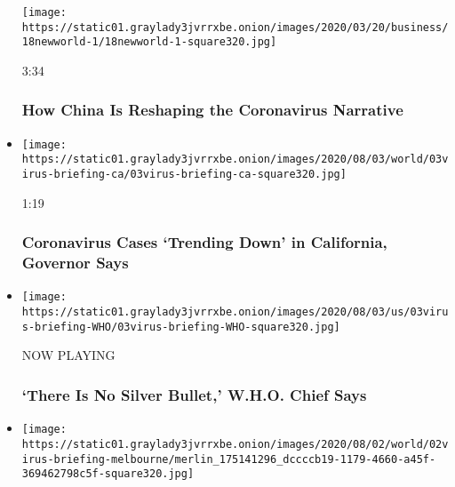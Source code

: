 \begin{itemize}
  \texttt{[image: https://static01.graylady3jvrrxbe.onion/images/2020/03/20/business/18newworld-1/18newworld-1-square320.jpg]}

  3:34

  \hypertarget{how-china-is-reshaping-the-coronavirus-narrative}{%
  \subsubsection{How China Is Reshaping the Coronavirus
  Narrative}\label{how-china-is-reshaping-the-coronavirus-narrative}}
\item
  \href{https://www.nytimes3xbfgragh.onion/video/us/100000007271181/california-virus-cases-trend-down.html?action=click\&module=video-series-bar\&region=header\&pgtype=Article\&playlistId=video/coronavirus-news-update}{}

  \texttt{[image: https://static01.graylady3jvrrxbe.onion/images/2020/08/03/world/03virus-briefing-ca/03virus-briefing-ca-square320.jpg]}

  1:19

  \hypertarget{coronavirus-cases-trending-down-in-california-governor-says}{%
  \subsubsection{Coronavirus Cases `Trending Down' in California,
  Governor
  Says}\label{coronavirus-cases-trending-down-in-california-governor-says}}
\item
  \texttt{[image: https://static01.graylady3jvrrxbe.onion/images/2020/08/03/us/03virus-briefing-WHO/03virus-briefing-WHO-square320.jpg]}

  NOW PLAYING

  \hypertarget{there-is-no-silver-bullet-who-chief-says-1}{%
  \subsubsection{`There Is No Silver Bullet,' W.H.O. Chief
  Says}\label{there-is-no-silver-bullet-who-chief-says-1}}
\item
  \href{https://www.nytimes3xbfgragh.onion/video/world/australia/100000007269116/coronavirus-restrictions-melbourne.html?action=click\&module=video-series-bar\&region=header\&pgtype=Article\&playlistId=video/coronavirus-news-update}{}

  \texttt{[image: https://static01.graylady3jvrrxbe.onion/images/2020/08/02/world/02virus-briefing-melbourne/merlin\_175141296\_dccccb19-1179-4660-a45f-369462798c5f-square320.jpg]}


\end{itemize}
